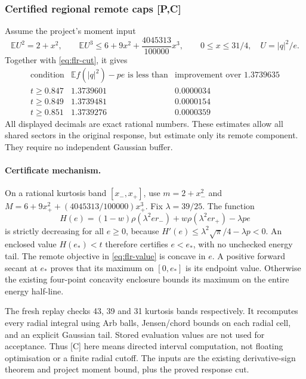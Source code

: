 \subsubsection{Certified regional remote caps [P,C]}
Assume the project's moment input
\[
 \mathbb E U^2=2+x^2,\qquad
 \mathbb E U^3\le6+9x^2+\frac{4045313}{100000}x^3,
 \qquad 0\le x\le31/4,
 \quad U=|q|^2/e.
\]
Together with \eqref{eq:flr-cut}, it gives
\[
\begin{array}{c|c|c}
 \text{condition}&\mathbb E f(|q|^2)-pe\text{ is less than}
      &\text{improvement over }1.3739635\\\hline
 t\ge0.847&1.3739601&0.0000034\\
 t\ge0.849&1.3739481&0.0000154\\
 t\ge0.851&1.3739276&0.0000359
\end{array}
\]
All displayed decimals are exact rational numbers. These estimates allow
all shared sectors in the original response, but estimate only its
remote component. They require no independent Gaussian buffer.

\paragraph{Certificate mechanism.}
On a rational kurtosis band $[x_-,x_+]$, use
$m=2+x_-^2$ and $M=6+9x_+^2+(4045313/100000)x_+^3$.
Fix $\lambda=39/25$. The function
\[
 H(e)=(1-w)\rho(\lambda^2er_-)+w\rho(\lambda^2er_+)-\lambda pe
\]
is strictly decreasing for all $e\ge0$, because
$H'(e)\le\lambda^2\sqrt\pi/4-\lambda p<0$.
An enclosed value $H(e_*)<t$ therefore certifies $e<e_*$,
with no unchecked energy tail. The remote objective in
\eqref{eq:flr-value} is concave in $e$. A positive forward secant at
$e_*$ proves that its maximum on $[0,e_*]$ is its endpoint value.
Otherwise the existing four-point concavity enclosure bounds its
maximum on the entire energy half-line.

The fresh replay checks 43, 39 and 31 kurtosis bands respectively.
It recomputes every radial integral using Arb balls, Jensen/chord
bounds on each radial cell, and an explicit Gaussian tail.
Stored evaluation values are not used for acceptance. Thus [C] here
means directed interval computation, not floating optimisation or a
finite radial cutoff. The inputs are the existing derivative-sign
theorem and project moment bound, plus the proved response cut.

